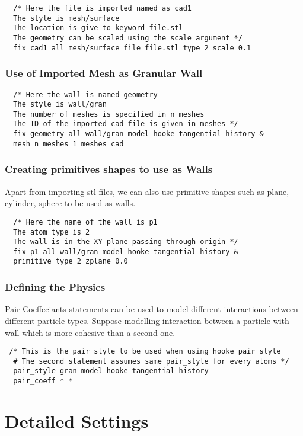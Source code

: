 \documentclass[8pt]{extarticle} %
\begin{document}
\begin{multicols}{3}
\begin{verbatim}
  /* Here the file is imported named as cad1
  The style is mesh/surface
  The location is give to keyword file.stl
  The geometry can be scaled using the scale argument */
  fix cad1 all mesh/surface file file.stl type 2 scale 0.1
  \end{verbatim}

\subsubsection{Use of Imported Mesh as Granular Wall}

\begin{verbatim}
  /* Here the wall is named geometry
  The style is wall/gran
  The number of meshes is specified in n_meshes
  The ID of the imported cad file is given in meshes */
  fix geometry all wall/gran model hooke tangential history &
  mesh n_meshes 1 meshes cad
  \end{verbatim}

\subsubsection{Creating primitives shapes to use as Walls}

Apart from importing stl files, we can also use primitive shapes such as plane, cylinder, sphere to be used as walls.
\begin{verbatim}
  /* Here the name of the wall is p1
  The atom type is 2
  The wall is in the XY plane passing through origin */
  fix p1 all wall/gran model hooke tangential history &
  primitive type 2 zplane 0.0
  \end{verbatim}
\subsubsection{Defining the Physics}
  Pair Coeffeciants statements can be used to model different interactions between different particle types. Suppose modelling interaction between a particle with wall which is more cohesive than a second one.

  \begin{verbatim}
 /* This is the pair style to be used when using hooke pair style
  # The second statement assumes same pair_style for every atoms */
  pair_style gran model hooke tangential history
  pair_coeff * *
\end{verbatim}

\section{Detailed Settings}


\end{multicols}
\end{document}
